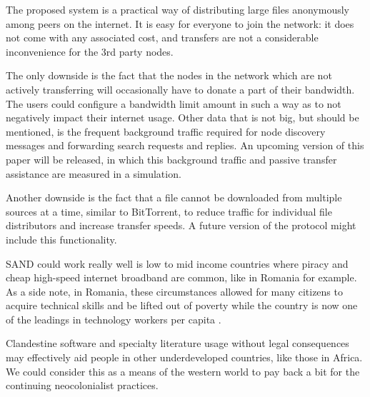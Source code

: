 The proposed system is a practical way of distributing large files anonymously 
among peers on the internet. It is easy for everyone to join the network: it 
does not come with any associated cost, and transfers are not a considerable 
inconvenience for the 3rd party nodes.

The only downside is the fact that the nodes in the network which are not 
actively transferring will occasionally have to donate a part of their 
bandwidth. The users could configure a bandwidth limit amount in such a way as 
to not negatively impact their internet usage. Other data that is not big, but 
should be mentioned, is the frequent background traffic required for node 
discovery messages and forwarding search requests and replies. An upcoming 
version of this paper will be released, in which this background traffic and 
passive transfer assistance are measured in a simulation.

Another downside is the fact that a file cannot be downloaded from multiple 
sources at a time, similar to BitTorrent, to reduce traffic for individual file 
distributors and increase transfer speeds. A future version of the protocol 
might include this functionality.

SAND could work really well is low to mid income countries where piracy and 
cheap high-speed internet broadband are common, like in Romania for example. As 
a side note, in Romania, these circumstances allowed for many citizens to 
acquire technical skills and be lifted out of poverty while the country is now 
one of the leadings in technology workers per capita \cite{romaniasoftwaredev}.

Clandestine software and specialty literature usage without legal consequences 
may effectively aid people in other underdeveloped countries, like those in 
Africa. We could consider this as a means of the western world to pay back a 
bit for the continuing neocolonialist practices.

